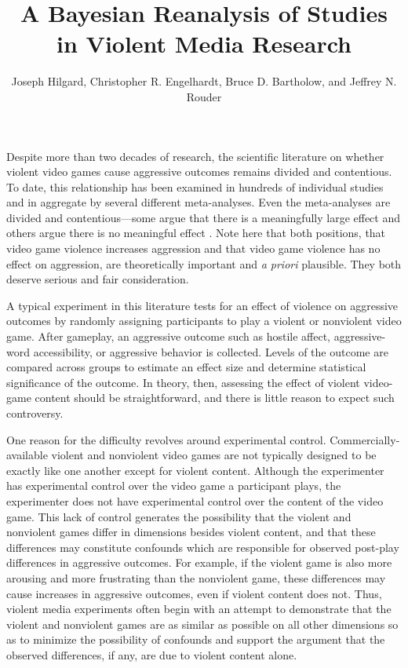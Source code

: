 \documentclass[man]{apa6}
\author{Joseph Hilgard, Christopher R. Engelhardt, Bruce D. Bartholow, and Jeffrey N. Rouder}
\title{A Bayesian Reanalysis of Studies in Violent Media Research}
\affiliation{University of Missouri - Columbia}
\begin{document}
\maketitle

Despite more than two decades of research, the scientific literature on whether violent video games cause aggressive outcomes remains divided and contentious. To date, this relationship has been examined in hundreds of individual studies and in aggregate by several different meta-analyses. Even the meta-analyses are divided and contentious---some argue that there is a meaningfully large effect \citep{Anderson:etal:2010,Greitemeyer:Mugge:2014} and others argue there is no meaningful effect \citep[e.g.,][]{Ferguson:Kilburn:2009,Sherry:2001}. Note here that both positions, that video game violence increases aggression and that video game violence has no effect on aggression, are theoretically important and {\em a priori} plausible.  They both deserve serious and fair consideration. 

A typical experiment in this literature tests for an effect of violence on aggressive outcomes by randomly assigning participants to play a violent or nonviolent video game. After gameplay, an aggressive outcome such as hostile affect, aggressive-word accessibility, or aggressive behavior is collected. Levels of the outcome are compared across groups to estimate an effect size and determine statistical significance of the outcome.  In theory, then, assessing the effect of violent video-game content should be straightforward, and there is little reason to expect such controversy.

One reason for the difficulty revolves around experimental control.  Commercially-available violent and nonviolent video games are not typically designed to be exactly like one another except for violent content. Although the experimenter has experimental control over the video game a participant plays, the experimenter does not have experimental control over the content of the video game. This lack of control generates the possibility that the violent and nonviolent games differ in dimensions besides violent content, and that these differences may constitute confounds which are responsible for observed post-play differences in aggressive outcomes. For example, if the violent game is also more arousing and more frustrating than the nonviolent game, these differences may cause increases in aggressive outcomes, even if violent content does not.   Thus, violent media experiments often begin with an attempt to demonstrate that the violent and nonviolent games are as similar as possible on all other dimensions so as to minimize the possibility of confounds and support the argument that the observed differences, if any, are due to violent content alone.
\end{document}
